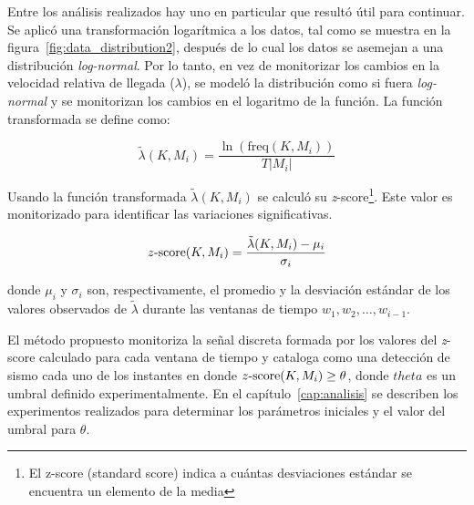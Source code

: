 Entre los análisis realizados hay uno en particular que resultó útil para continuar. Se aplicó una transformación logarítmica a los datos, tal como se muestra en la figura~\ref{fig:data_distribution2}, después de lo cual los datos se asemejan a una distribución {\em log-normal}.
%
Por lo tanto, en vez de monitorizar los cambios en la velocidad relativa de llegada ($\lambda$), se modeló la distribución como si fuera {\em log-normal} y se monitorizan los cambios en el logaritmo de la función. La función transformada se define como:

\begin{equation}
\label{eq:log_lambda}
\tilde{\lambda}(K, M_i) = \frac{\ln\left(\mathrm{freq}(K,M_i)\right)}{T |M_i|}
\end{equation}

Usando la función transformada $\tilde{\lambda}(K, M_i)$ se calculó su {\em z}-score\footnote{El z-score (standard score) indica a cuántas desviaciones estándar se encuentra un elemento de la media}. Este valor es monitorizado para identificar las variaciones significativas.  

\newcommand{\zscore}{\ensuremath{z\textnormal{-}\mathrm{score}}}
\begin{equation}
\label{eq:zscore}
\zscore(K, M_i) = \frac{\tilde{\lambda}(K, M_i)-\mu_i}{\sigma_i}
\end{equation}

\noindent donde $\mu_i$ y $\sigma_i$ son, respectivamente, el promedio y la desviación estándar de los valores observados de $\tilde\lambda$ durante las ventanas de tiempo $w_1, w_2, \dots, w_{i-1}$.

El método propuesto monitoriza la señal discreta formada por los valores del {\em z}-score calculado para cada ventana de tiempo y cataloga como una detección de sismo cada uno de los instantes en donde $\zscore(K, M_i)\ge\theta$, donde $theta$ es un umbral definido experimentalmente.
%
En el capítulo~\ref{cap:analisis} se describen los experimentos realizados para determinar los parámetros iniciales y el valor del umbral para $\theta$. 
